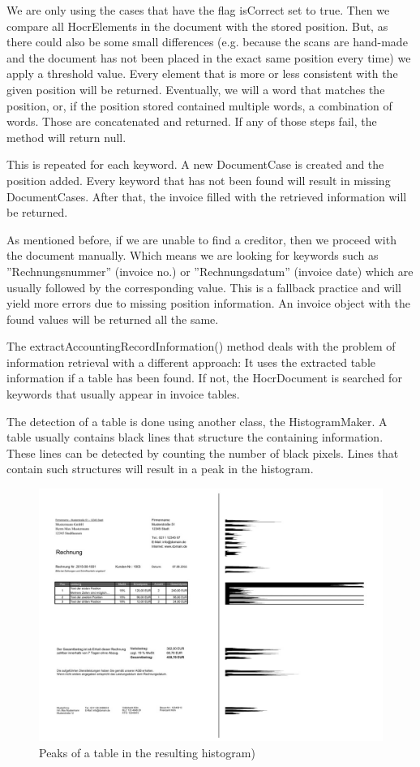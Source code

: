 We are only using the cases that have the flag isCorrect set to true. Then we compare all HocrElements in the document with the stored position. But, as there could also be some small differences (e.g. because the scans are hand-made and the document has not been placed in the exact same position every time) we apply a threshold value. Every element that is more or less consistent with the given position will be returned. Eventually, we will a word that matches the position, or, if the position stored contained multiple words, a combination of words. Those are concatenated and returned. If any of those steps fail, the method will return null.

This is repeated for each keyword. A new DocumentCase is created and the position added. Every keyword that has not been found will result in missing DocumentCases. After that, the invoice filled with the retrieved information will be returned.

As mentioned before, if we are unable to find a creditor, then we proceed with the document manually. Which means we are looking for keywords such as ''Rechnungsnummer'' (invoice no.) or ''Rechnungsdatum'' (invoice date) which are usually followed by the corresponding value. This is a fallback practice and will yield more errors due to missing position information. An invoice object with the found values will be returned all the same.

The extractAccountingRecordInformation() method deals with the problem of information retrieval with a different approach: It uses the extracted table information if a table has been found. If not, the HocrDocument is searched for keywords that usually appear in invoice tables.

The detection of a table is done using another class, the HistogramMaker. A table usually contains black lines that structure the containing information. These lines can be detected by counting the number of black pixels. Lines that contain such structures will result in a peak in the histogram. 

\begin{figure}[h]
\centering
\includegraphics[scale=0.6]{Images/OCR/histogram.jpg}
\caption{Peaks of a table in the resulting histogram)  \label{histogramImage}}
\end{figure}

